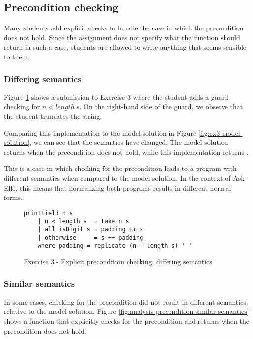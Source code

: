 \subsection{Precondition checking}

Many students add explicit checks to handle the case in which the precondition does not hold. Since the assignment does not specify what the function should return in such a case, students are allowed to write anything that seems sensible to them.

\subsubsection{Differing semantics}

Figure \ref{fig:analysis-precondition-example} shows a submission to Exercise 3 where the student adds a guard checking for $n < length\ s$. On the right-hand side of the guard, we observe that the student truncates the string.

Comparing this implementation to the model solution in Figure \ref{fig:ex3-model-solution}, we can see that the semantics have changed. The model solution returns  when the precondition does not hold, while this implementation returns .

This is a case in which checking for the precondition leads to a program with different semantics when compared to the model solution. In the context of Ask-Elle, this means that normalizing both programs  results in different normal forms.

\begin{figure}
\centering
\begin{verbatim}
printField n s
    | n < length s  = take n s
    | all isDigit s = padding ++ s
    | otherwise     = s ++ padding
    where padding = replicate (n - length s) ' '
\end{verbatim}
\caption{Exercise 3 - Explicit precondition checking; differing semantics}
\label{fig:analysis-precondition-example}
\end{figure}

\subsubsection{Similar semantics}

In some cases, checking for the precondition did not result in different semantics relative to the model solution. Figure \ref{fig:analysis-precondition-similar-semantics} shows a function that explicitly checks for the precondition and returns  when the precondition does not hold.


